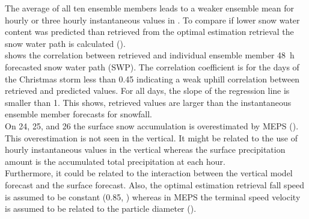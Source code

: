 The average of all ten ensemble members leads to a weaker ensemble mean for hourly or three hourly instantaneous values in . 
To compare if lower snow water content was predicted than retrieved from the optimal estimation retrieval the snow water path is calculated (). 
\\
 shows the correlation between retrieved and individual ensemble member \SI{48}{\hour} forecasted snow water path (SWP).  The correlation coefficient is for the days of the Christmas storm less than \SI{0.45}{\SWP} indicating a weak uphill correlation between retrieved and predicted values. For all days, the slope of the regression line is smaller than \SI{1}{\SWP}. This shows, retrieved values are larger than the instantaneous ensemble member forecasts for snowfall. 
\\
On \num{24}, \num{25}, and \SI{26}{\dec} the surface snow accumulation is overestimated by MEPS (). This overestimation is not seen in the vertical. It might be related to the use of hourly instantaneous values in the vertical whereas the surface precipitation amount is the accumulated total precipitation at each hour. 
\\
Furthermore, it could be related to the interaction between the vertical model forecast and the surface forecast. Also, the optimal estimation retrieval fall speed is assumed to be constant (\SI{0.85}{\mPs}, ) whereas in MEPS the terminal speed velocity is assumed to be related to the particle diameter (). 
\\

